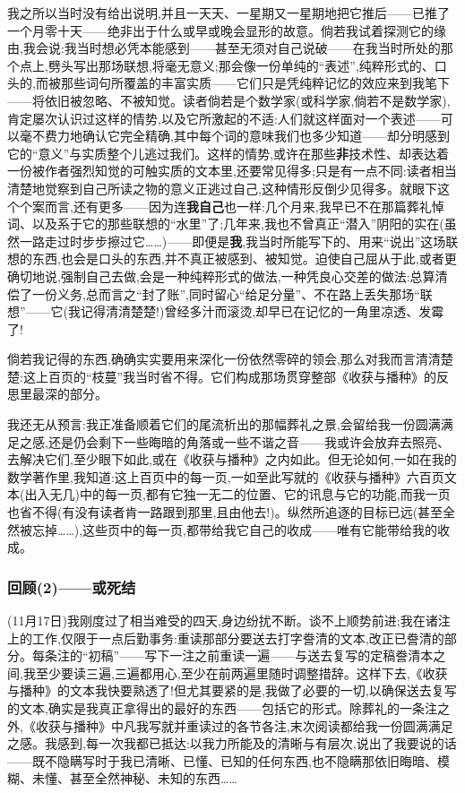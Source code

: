 我之所以当时没有给出说明,并且一天天、一星期又一星期地把它推后——已推了一个月零十天——绝非出于什么或早或晚会显形的故意。倘若我试着探测它的缘由,我会说:我当时想必凭本能感到——甚至无须对自己说破——在我当时所处的那个点上,劈头写出那场联想,将毫无意义;那会像一份单纯的“表述”,纯粹形式的、口头的,而被那些词句所覆盖的丰富实质——它们只是凭纯粹记忆的效应来到我笔下——将依旧被忽略、不被知觉。读者倘若是个数学家(或科学家,倘若不是数学家),肯定屡次认识过这样的情势,以及它所激起的不适:人们就这样面对一个表述——可以毫不费力地确认它完全精确,其中每个词的意味我们也多少知道——却分明感到它的“意义”与实质整个儿逃过我们。这样的情势,或许在那些\textbf{非}技术性、却表达着一份被作者强烈知觉的可触实质的文本里,还要常见得多;只是有一点不同:读者相当清楚地觉察到自己所读之物的意义正逃过自己,这种情形反倒少见得多。就眼下这个个案而言,还有更多——因为连\textbf{我自己}也一样:几个月来,我早已不在那篇葬礼悼词、以及系于它的那些联想的“水里”了;几年来,我也不曾真正“潜入”阴阳的实在(虽然一路走过时步步擦过它……)——即便是\textbf{我},我当时所能写下的、用来“说出”这场联想的东西,也会是口头的东西,并不真正被感到、被知觉。迫使自己屈从于此,或者更确切地说,强制自己去做,会是一种纯粹形式的做法,一种凭良心交差的做法:总算清偿了一份义务,总而言之“封了账”,同时留心“给足分量”、不在路上丢失那场“联想”——它(我记得清清楚楚!)曾经多汁而滚烫,却早已在记忆的一角里凉透、发霉了!

\dmark{}倘若我记得的东西,确确实实要用来深化一份依然零碎的领会,那么对我而言清清楚楚:这上百页的“枝蔓”我当时省不得。它们构成那场贯穿整部《收获与播种》的反思里最深的部分。

我还无从预言:我正准备顺着它们的尾流析出的那幅葬礼之景,会留给我一份圆满满足之感,还是仍会剩下一些晦暗的角落或一些不谐之音——我或许会放弃去照亮、去解决它们,至少眼下如此,或在《收获与播种》之内如此。但无论如何,一如在我的数学著作里,我知道:这上百页中的每一页,一如至此写就的《收获与播种》六百页文本(出入无几)中的每一页,都有它独一无二的位置、它的讯息与它的功能,而我一页也省不得(有没有读者肯一路跟到那里,且由他去!)。纵然所追逐的目标已远(甚至全然被忘掉……),这些页中的每一页,都带给我它自己的收成——唯有它能带给我的收成。

\subsubsection*{回顾(2)——或死结}
\label{ch18:local:h37}

\label{ch18:local:n32}

(11月17日)我刚度过了相当难受的四天,身边纷扰不断。谈不上顺势前进;我在诸注上的工作,仅限于一点后勤事务:重读那部分要送去打字誊清的文本,改正已誊清的部分。每条注的“初稿”——写下一注之前重读一遍——与送去复写的定稿誊清本之间,我至少要读三遍,三遍都用心,至少在前两遍里随时调整措辞。这样下去,《收获与播种》的文本我快要熟透了!但尤其要紧的是,我做了必要的一切,以确保送去复写的文本,确实是我真正拿得出的最好的东西——包括它的形式。除葬礼的一条注之外,《收获与播种》中凡我写就并重读过的各节各注,末次阅读都给我一份圆满满足之感。我感到,每一次我都已抵达:以我力所能及的清晰与有层次,说出了我要说的话——既不隐瞒写时于我已清晰、已懂、已知的任何东西,也不隐瞒那依旧晦暗、模糊、未懂、甚至全然神秘、未知的东西……

